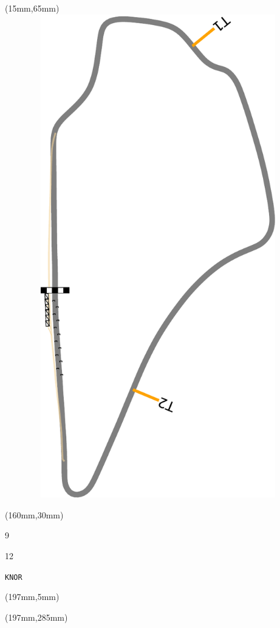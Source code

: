 \begin{textblock*}{185mm}(15mm,65mm)%
\centering
\mbox{\includegraphics[width=185mm,height=210mm,keepaspectratio]{PT/KNOR.pdf}}
\end{textblock*}
\begin{textblock*}{40mm}(160mm,30mm)%
\Large
\par{} 
\par9 
\par12 
\par\hfill\tiny\tt KNOR\\
\end{textblock*}
\begin{textblock*}{20mm}(197mm,5mm)%
\fbox{\thepage}
\label{KNOR}
\end{textblock*}
\begin{textblock*}{20mm}(197mm,285mm)%
\fbox{\thepage}
\end{textblock*}

